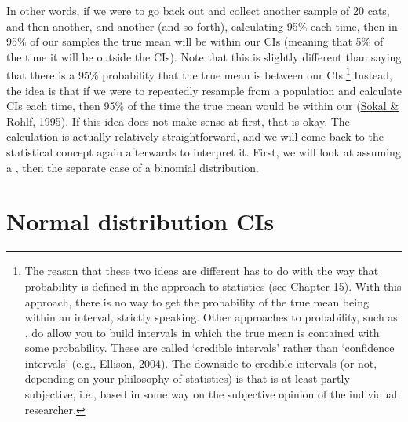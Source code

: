 \documentclass[
  openany]{krantz}
\begin{document}
In other words, if we were to go back out and collect another sample of 20 cats, and then another, and another (and so forth), calculating 95\%  each time, then in 95\% of our samples the true mean will be within our CIs (meaning that 5\% of the time it will be outside the CIs).
Note that this is slightly different than saying that there is a 95\% probability that the true mean is between our CIs.\footnote{The reason that these two ideas are different has to do with the way that probability is defined in the  approach to statistics (see \protect\hyperlink{Chapter_15}{Chapter 15}). With this approach, there is no way to get the probability of the true mean being within an interval, strictly speaking. Other approaches to probability, such as , do allow you to build intervals in which the true mean is contained with some probability. These are called `credible intervals' rather than `confidence intervals' (e.g., \protect\hyperlink{ref-Ellison2004}{Ellison, 2004}). The downside to credible intervals (or not, depending on your philosophy of statistics) is that  is at least partly subjective, i.e., based in some way on the subjective opinion of the individual researcher.}
Instead, the idea is that if we were to repeatedly resample from a population and calculate CIs each time, then 95\% of the time the true mean would be within our  (\protect\hyperlink{ref-Sokal1995}{Sokal \& Rohlf, 1995}).
If this idea does not make sense at first, that is okay.
The calculation is actually relatively straightforward, and we will come back to the statistical concept again afterwards to interpret it.
First, we will look at  assuming a , then the separate case of a binomial distribution.

\hypertarget{normal-distribution-cis}{%
\section{Normal distribution CIs}\label{normal-distribution-cis}}
\end{document}
